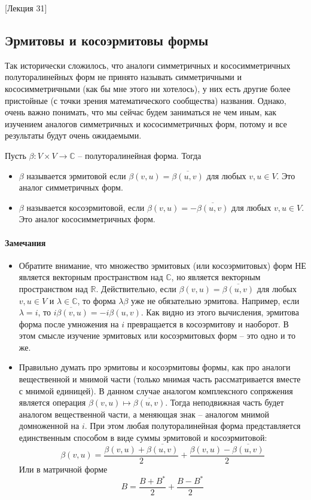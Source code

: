 [Лекция 31]


\subsection{Эрмитовы и косоэрмитовы формы}

Так исторически сложилось, что аналоги симметричных и кососимметричных полуторалинейных форм не принято называть симметричными и кососимметричными (как бы мне этого ни хотелось), у них есть другие более пристойные (с точки зрения математического сообщества) названия.
Однако, очень важно понимать, что мы сейчас будем заниматься не чем иным, как изучением аналогов симметричных  и кососимметричных форм, потому и все результаты будут очень ожидаемыми.

\begin{definition}
Пусть $\beta\colon V\times V\to \mathbb C$ -- полуторалинейная форма.
Тогда 
\begin{itemize}
\item $\beta$ называется эрмитовой если $\beta(v, u) = \overline{\beta(u,v)}$ для любых $v,u\in V$.
Это аналог симметричных форм.

\item $\beta$ называется косоэрмитовой, если $\beta(v, u) = -\overline{\beta(u,v)}$ для любых $v,u\in V$.
Это аналог кососимметричных форм.
\end{itemize}
\end{definition}

\paragraph{Замечания}

\begin{itemize}
\item Обратите внимание, что множество эрмитовых (или косоэрмитовых) форм НЕ является векторным пространством над $\mathbb C$, но является векторным пространством над $\mathbb R$.
Действительно, если $\beta(v, u) = \overline{\beta(u,v)}$ для любых $v, u \in V$ и $\lambda\in \mathbb C$, то форма $\lambda \beta$ уже не обязательно эрмитова.
Например, если $\lambda = i$, то $\overline{i\beta(v,u)} = -i \beta(u,v)$.
Как видно из этого вычисления, эрмитова форма после умножения на $i$ превращается в косоэрмитову и наоборот.
В этом смысле изучение эрмитовых или косоэрмитовых форм -- это одно и то же.

\item Правильно думать про эрмитовы и косоэрмитовы формы, как про аналоги вещественной и мнимой части (только мнимая часть рассматривается вместе с мнимой единицей).
В данном случае аналогом комплексного сопряжения является операция $\beta(v,u) \mapsto \overline{\beta(u, v)}$.
Тогда неподвижная часть будет аналогом вещественной части, а меняющая знак -- аналогом мнимой домноженной на $i$.
При этом любая полуторалинейная форма представляется единственным способом в виде суммы эрмитовой и косоэрмитовой:
\[
\beta(v,u) = \frac{\beta(v, u) + \overline{\beta(u, v)}}{2} + \frac{\beta(v, u) - \overline{\beta(u, v)}}{2} 
\]
Или в матричной форме
\[
B = \frac{B + B^*}{2} + \frac{B - B^*}{2}
\]
\end{itemize}

